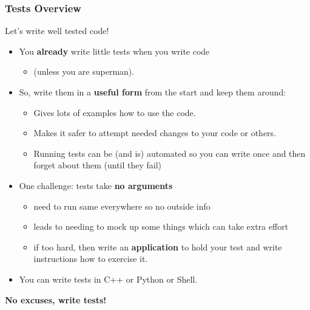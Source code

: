 \documentclass[xcolor=dvipsnames]{beamer}
\begin{document}
\begin{frame}
  \frametitle{Tests Overview}
  \footnotesize
  Let's write well tested code!

  \vspace{2mm}

  \begin{itemize}
  \item You \textbf{already} write little tests when you write code 
    \begin{itemize}  \footnotesize
    \item (unless you are superman).
    \end{itemize}
  \item So, write them in a \textbf{useful form} from the start and
    keep them around:
    \begin{itemize}  \footnotesize
    \item Gives lots of examples how to use the code.
    \item Makes it safer to attempt needed changes to your code or others.
    \item Running tests can be (and is) automated so you can write
      once and then forget about them (until they fail)
    \end{itemize}
  \item One challenge: tests take \textbf{no arguments}
    \begin{itemize}   \footnotesize
    \item need to run same everywhere so no outside info
    \item leads to needing to mock up some things which can take extra effort
    \item if too hard, then write an \textbf{application} to hold your
      test and write instructions how to exercise it.
    \end{itemize}
  \item You can write tests in C++ or Python or Shell.
  \end{itemize}

  \vspace{2mm}
  \textbf{No excuses, write tests!}
  \Smiley[1.5]{}
  
\end{frame}
\end{document}

